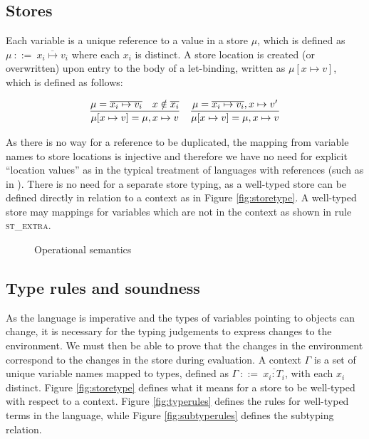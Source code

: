 \documentclass[preprint]{sigplanconf}
\newcommand{\figref}[1]{Figure \ref{#1}}
\begin{document}
\subsection{Stores}

Each variable is a unique reference to a value in a store $\mu$, which is 
defined as $\mu\:\mathrm{::=}\:\overline{x_i \mapsto v_i}$ where each $x_i$ is
distinct. A store location
is created (or overwritten) upon entry to the body of a let-binding, written as
$\mu[x \mapsto v]$, which is defined as follows:

\[
\begin{tabular}{cc}
\infer
{\mu[x \mapsto v] = \mu, x \mapsto v}
{\mu = \overline{x_i \mapsto v_i} & x \notin \overline{x_i}}
&
\infer
{\mu[x \mapsto v] = \mu, x \mapsto v}
{\mu = \overline{x_i \mapsto v_i}, x \mapsto v'}
\end{tabular}
\]

As there is no way for a reference to be duplicated, the mapping
from variable names to store locations is injective and therefore we have
no need for explicit ``location values'' as in the typical treatment of 
languages with references (such as in \cite{Pierce2002}). There is no need
for a separate store typing, as a well-typed store can be defined directly
in relation to a context as in \figref{fig:storetype}. A well-typed store
may mappings for variables which are not in the context as shown in
rule \textsc{st\_extra}.

\begin{figure}

\ottdefnreduce

\caption{\label{fig:opsemantics} Operational semantics}
\end{figure}

\subsection{Type rules and soundness}

As the language is imperative and the types of variables pointing to objects can
change, it is necessary for the typing judgements to express changes to the 
environment. We must then be able
to prove that the changes in the environment correspond to the changes in the
store during evaluation. A context $\Gamma$ is a set of unique variable names 
mapped to types, defined as $\Gamma\:\mathrm{::=}\:\overline{x_i : T_i}$,
with each $x_i$ distinct. \figref{fig:storetype} defines what it means for
a store to be well-typed with respect to a
context. \figref{fig:typerules} defines the rules for well-typed terms
in the language, while \figref{fig:subtyperules} defines the subtyping
relation.
\end{document}
